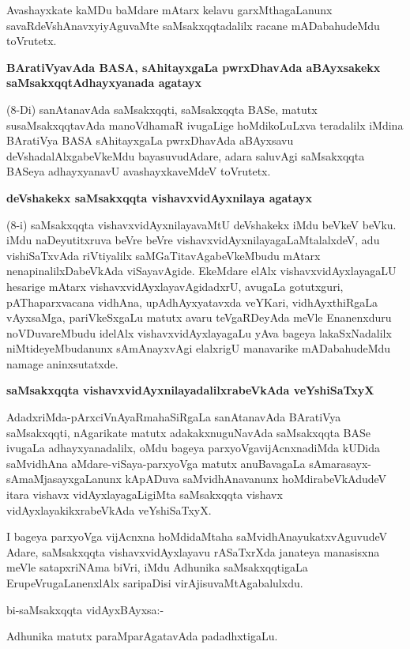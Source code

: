 Avashayxkate kaMDu baMdare mAtarx kelavu garxMthagaLanunx savaRdeVshAnavxyiyAgu\-vaMte saMsakxqqtadalilx racane mADabahudeMdu toVrutetx.

{\bigskip
\noindent
{\large\bf BAratiVyavAda BASA, sAhitayxgaLa pwrxDhavAda aBAyxsakekx saMsakxqqtAdhayxyanada agatayx}}\label{page37}
\medskip

\noindent
(8-Di) sanAtanavAda saMsakxqqti, saMsakxqqta BASe, matutx susaMsakxqqtavAda manoV\-dhamaR ivu\-ga\-Lige hoMdi\-koLuLxva teradalilx iMdina BAratiVya BASA sAhitayxgaLa pwrxDhavAda aBAyxsavu deVshadalAlxgabeV\-keMdu bayasuvudAdare, adara saluvAgi saMsakxqqta BASeya adhayxyanavU avashayxkaveMdeV toVrutetx.

{\bigskip
\noindent
{\large\bf deVshakekx saMsakxqqta vishavxvidAyxnilaya agatayx}}\label{page37a}
\medskip

\noindent
(8-i) saMsakxqqta vishavxvidAyxnilayavaMtU deVshakekx iMdu beVkeV beVku. iMdu naDeyutitxruva beVre beVre vishavxvidAyxnilayagaLaMtalalxdeV, adu vishiSaTxvAda riVtiyalilx saMGaTitavAgabeVkeMbudu mAtarx nenapi\-nalilxDa\-beVkAda viSayavAgide. EkeMdare elAlx vishavxvidAyxlayagaLU hesarige mAtarx vishavxvidAyxlayavAgi\-dadxrU, avugaLa gotutxguri, pAThaparxvacana vidhAna, upAdhAyxyatavxda veYKari, vidhAyxthiRgaLa vAyxsaMga, pariVkeSxgaLu matutx avaru teVgaRDeyAda meVle Enanenxduru noVDuvareMbudu idelAlx vishavxvidAyxlaya\-gaLu yAva bageya lakaSxNadalilx niMtideyeMbudanunx sAmAnayxvAgi elalxrigU manavarike mADa\-bahu\-deMdu namage aninxsutatxde.

{\bigskip
\noindent
{\large\bf saMsakxqqta vishavxvidAyxnilayadalilxrabeVkAda veYshiSaTxyX}}\label{page37b}
\medskip

\noindent
AdadxriMda-pArxciVnAyaRmahaSiRgaLa sanAtanavAda BAratiVya saMsakxqqti, nAgari\-kate matutx adakakx\-nuguNa\-vAda saMsakxqqta BASe ivugaLa adhayxyanadalilx, oMdu bageya parxyoVgavijAcnxnadiMda kUDida saMvi\-dhAna aMdare-viSaya-parxyoVga matutx anu\-BavagaLa sAmarasayx-sAmaMjasayxgaLanunx kApADuva saMvi\-dhAna\-vanunx hoMdira\-beVkAdudeV itara vishavx vidAyxlayagaLigiMta saMsakxqqta vishavx vidAyxlayakikxrabeVkAda veYshiSaTxyX.

I bageya parxyoVga vijAcnxna hoMdidaMtaha saMvidhAnayukatxvAguvudeV Adare, saMsakxqqta vishavx\-vidAyxlayavu rASaTxrXda janateya manasisxna meVle satapxriNAma biVri, iMdu Adhunika saMsakxqqtigaLa ErupeVru\-gaLanenxlAlx saripaDisi virAjisu\-vaMtAgabalulxdu.
\medskip

\noindent
bi-saMsakxqqta vidAyxBAyxsa:-

Adhunika matutx paraMparAgatavAda padadhxtigaLu.

